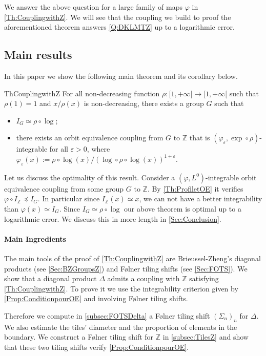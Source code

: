 \documentclass[english, 11pt, a4paper]{article}
\theoremstyle{definition}
\numberwithin{equation}{section}
\newcommand{\bZ}{\mathbb{Z}}
\newcommand{\BZ}{\Delta}
\begin{document}
We answer the above question for a large family of maps
$\varphi$ in \cref{Th:CouplingwithZ}. We will see that the coupling
we build to proof the aforementioned theorem answers \cref{Q:DKLMTZ}
up to a logarithmic error.

\subsection{Main results}
In this paper we show the following main theorem and its corollary below.

\begin{restatable}{Th}{CouplingwithZ}\label{Th:CouplingwithZ}
  For all non-decreasing function $\rho: [1,+\infty[
  \rightarrow [1,+\infty[$ such that $\rho(1)=1$ and $x/\rho(x)$ is
  non-decreasing, there exists a group $G$ such that
  \begin{itemize}
  \item $I_{G}\simeq \rho \circ \log$;
  \item there exists an orbit equivalence coupling from $G$ to $\bZ$ that is
    $(\varphi_{\varepsilon},\exp \circ \rho)$-integrable for all
    $\varepsilon>0$, where $\varphi_{\varepsilon}(x):={\rho\circ
      \log(x)}/{\left( \log\circ\rho\circ\log(x) \right)^{1+\varepsilon}}$.
  \end{itemize}
\end{restatable}

Let us discuss the optimality of this result. Consider a
$(\varphi,L^0)$-integrable orbit equivalence coupling from some group $G$ to
$\bZ$. By \cref{Th:ProfiletOE} it verifies $\varphi\circ I_{\bZ} \preccurlyeq
I_G$. In particular since $I_{\bZ}(x)\simeq x$, we can not have a better
integrability than $\varphi(x)\simeq I_G$. Since $I_{G}\simeq \rho \circ
\log$ our above theorem is optimal up to a logarithmic error. We discuss this in
more length in \cref{Sec:Conclusion}.

\paragraph{Main Ingredients} The main tools of the proof of
\cref{Th:CouplingwithZ} are Brieussel-Zheng’s 
diagonal products (see \cref{Sec:BZGroupsZ}) and Følner tiling shifts (see
\cref{Sec:FOTS}). We show that a diagonal product $\BZ$ admits a coupling with
$\bZ$ satisfying \cref{Th:CouplingwithZ}. To prove it we use the integrability
criterion given by \cref{Prop:ConditionpourOE} and involving Følner tiling
shifts. 

Therefore we compute in \cref{subsec:FOTSDelta} a Følner tiling shift
$(\Sigma_n)_n$ for $\BZ$. We also estimate the tiles’ diameter and the
proportion of elements in the boundary. We construct a Følner tiling shift for
$\bZ$ in \cref{subsec:TilesZ} and show that these two tiling shifts verify
\cref{Prop:ConditionpourOE}.
\end{document}

